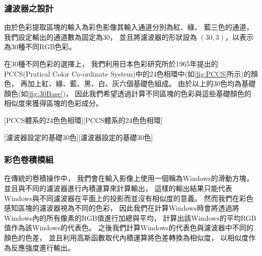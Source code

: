 \documentclass[class=NCU_thesis, crop=false]{standalone}
\begin{document}
		\subsubsection{濾波器之設計}
			由於色彩提取區塊的輸入為彩色影像其輸入通道分別為紅、綠、 藍三色的通道，
			我們設定輸出的通道數為固定為30，
			並且將濾波器的形狀設為 $\left(30 , 3\right)$，以表示為30種不同RGB色彩。

			在30種不同色彩的選擇上，
			我們利用日本色彩研究所於1965年提出的PCCS(Pratical Color Co-ordinate System)中的24色相環中(如\cref{fig:PCCS}所示)的顏色，
			再加上紅、綠、藍、黑、白、灰六個基礎色組成。
			由於以上的30色均為基礎顏色(如\cref{fig:30Base})，
			因此我們希望透過計算不同區塊的色彩與這些基礎顏色的相似度來獲得區塊的色彩成分。

			[PCCS體系的24色色相環\cite{PCCScite}][PCCS體系的24色色相環]

			[濾波器設定的基礎30色][濾波器設定的基礎30色]

		\subsubsection{彩色卷積模組}
			在傳統的卷積操作中，
			我們會在輸入影像上使用一個稱為Windows的滑動方塊，
			並且與不同的濾波器進行內積運算來計算輸出，
			這樣的輸出結果只能代表Windows與不同濾波器在平面上的投影而並沒有相似度的意義。
			然而我們在彩色感知區塊的濾波器視為不同的色彩，
			因此我們在計算Windows時會將透過將Windows內的所有像素的RGB值進行加總與平均，
			計算出該Windows的平均RGB值作為該Windows的代表色。
			之後我們計算Windows的代表色與濾波器中不同的顏色的色差，
			並且利用高斯函數取代內積運算將色差轉換為相似度，
			以相似度作為反應強度進行輸出。
\end{document}
